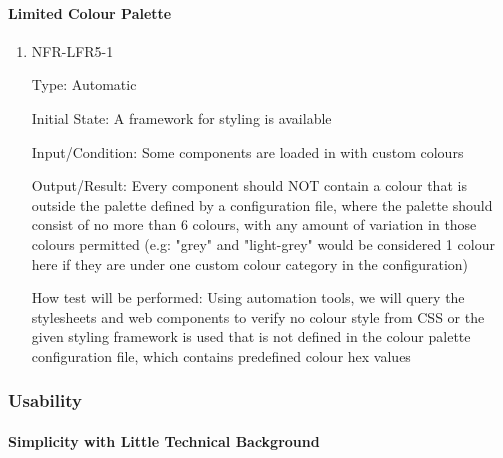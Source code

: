 \documentclass[12pt, titlepage]{article}
\begin{document}
\paragraph{Limited Colour Palette}

\begin{enumerate}

\item{NFR-LFR5-1\\}

Type: Automatic
					
Initial State: A framework for styling is available
					
Input/Condition: Some components are loaded in with custom colours
					
Output/Result: Every component should NOT contain a colour that is outside the palette defined by a configuration file, where the palette should consist of no more than 6 colours, with any amount of variation in those colours permitted (e.g: "grey" and "light-grey" would be considered 1 colour here if they are under one custom colour category in the configuration)
					
How test will be performed: Using automation tools, we will query the stylesheets and web components to verify no colour style from CSS or the given styling framework is used that is not defined in the colour palette configuration file, which contains predefined colour hex values

\end{enumerate}

\subsubsection{Usability}

\paragraph{Simplicity with Little Technical Background}
\end{document}
